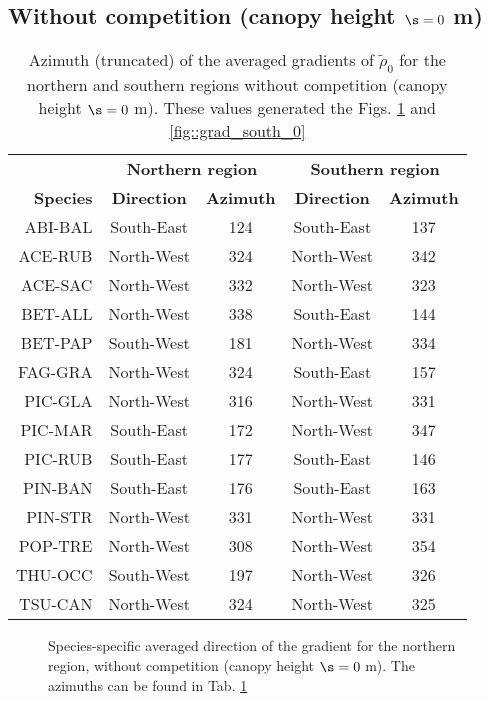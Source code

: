 \begin{refsection}
\subsection{Without competition (canopy height $ \s = 0 $ m)}
\begin{table}[ht]
\centering
\caption{Azimuth (truncated) of the averaged gradients of $ \tilde \rho_0 $ for the northern and southern regions without competition (canopy height $ \s = 0 $ m). These values generated the Figs. \ref{fig::grad_north_0} and \ref{fig::grad_south_0} \label{tab::azimuth_0}}
\begin{tabular}{rcccc}
	\toprule
	~ & \multicolumn{2}{c}{\textbf{Northern region}} & \multicolumn{2}{c}{\textbf{Southern region}} \\
	\cmidrule(lr){2-3} \cmidrule(lr){4-5}
	\textbf{Species} & \textbf{Direction} & \textbf{Azimuth} & \textbf{Direction} & \textbf{Azimuth} \\
	\midrule
		ABI-BAL & South-East & 124 & South-East & 137 \\
		ACE-RUB & North-West & 324 & North-West & 342 \\
		ACE-SAC & North-West & 332 & North-West & 323 \\
		BET-ALL & North-West & 338 & South-East & 144 \\
		BET-PAP & South-West & 181 & North-West & 334 \\
		FAG-GRA & North-West & 324 & South-East & 157 \\
		PIC-GLA & North-West & 316 & North-West & 331 \\
		PIC-MAR & South-East & 172 & North-West & 347 \\
		PIC-RUB & South-East & 177 & South-East & 146 \\
		PIN-BAN & South-East & 176 & South-East & 163 \\
		PIN-STR & North-West & 331 & North-West & 331 \\
		POP-TRE & North-West & 308 & North-West & 354 \\
		THU-OCC & South-West & 197 & North-West & 326 \\
		TSU-CAN & North-West & 324 & North-West & 325 \\
	\bottomrule
\end{tabular}
\end{table}

\begin{figure}
	\centering
	
	\caption{Species-specific averaged direction of the gradient for the northern region, without competition (canopy height $ \s = 0 $ m). The azimuths can be found in Tab. \ref{tab::azimuth_0} \label{fig::grad_north_0}}
\end{figure}


\end{refsection}
